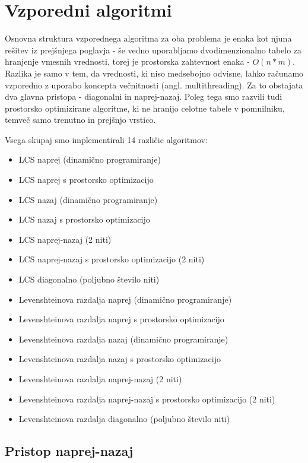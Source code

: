 \documentclass[a4paper,12pt,openright]{book}
\begin{document}
\chapter{Vzporedni algoritmi}

Osnovna struktura vzporednega algoritma za oba problema je enaka kot njuna rešitev iz prejšnjega poglavja - še vedno uporabljamo dvodimenzionalno tabelo za hranjenje vmesnih vrednosti, torej je prostorska zahtevnost enaka - \begin{math}O(n*m)\end{math}. Razlika je samo v tem, da vrednosti, ki niso medsebojno odvisne, lahko računamo vzporedno z uporabo koncepta večnitnosti (angl. multithreading). Za to obstajata dva glavna pristopa - diagonalni in naprej-nazaj. Poleg tega smo razvili tudi prostorsko optimizirane algoritme, ki ne hranijo celotne tabele v pomnilniku, temveč samo trenutno in prejšnjo vrstico. 

Vsega skupaj smo implementirali 14 različic algoritmov:
\begin{itemize}
  \item LCS naprej (dinamično programiranje)
  \item LCS naprej s prostorsko optimizacijo
  \item LCS nazaj (dinamično programiranje)
  \item LCS nazaj s prostorsko optimizacijo
  \item LCS naprej-nazaj (2 niti)
  \item LCS naprej-nazaj s prostorsko optimizacijo (2 niti)
  \item LCS diagonalno (poljubno število niti)
  \item Levenshteinova razdalja naprej (dinamično programiranje)
  \item Levenshteinova razdalja naprej s prostorsko optimizacijo
  \item Levenshteinova razdalja nazaj (dinamično programiranje)
  \item Levenshteinova razdalja nazaj s prostorsko optimizacijo
  \item Levenshteinova razdalja naprej-nazaj (2 niti)
  \item Levenshteinova razdalja naprej-nazaj s prostorsko optimizacijo (2 niti)
  \item Levenshteinova razdalja diagonalno (poljubno število niti)
\end{itemize}

\section{Pristop naprej-nazaj}
\end{document}
